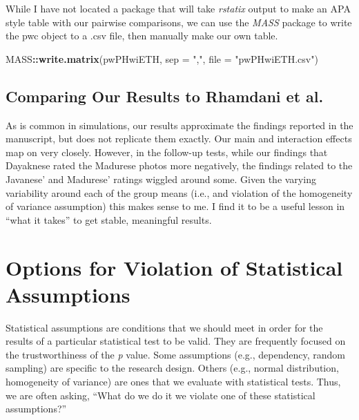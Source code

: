 \documentclass[
  11pt,
]{book}
\newenvironment{Shaded}{\begin{snugshade}}{\end{snugshade}}
\newcommand{\AttributeTok}[1]{\textcolor[rgb]{0.27,0.27,0.27}{#1}}
\newcommand{\FunctionTok}[1]{\textcolor[rgb]{0.27,0.27,0.27}{\textbf{#1}}}
\newcommand{\NormalTok}[1]{#1}
\newcommand{\SpecialCharTok}[1]{\textcolor[rgb]{0.43,0.43,0.43}{\textbf{#1}}}
\newcommand{\StringTok}[1]{\textcolor[rgb]{0.5,0.5,0.5}{#1}}
\begin{document}
While I have not located a package that will take \emph{rstatix} output to make an APA style table with our pairwise comparisons, we can use the \emph{MASS} package to write the pwc object to a .csv file, then manually make our own table.

\begin{Shaded}
\begin{Highlighting}[]
\NormalTok{MASS}\SpecialCharTok{::}\FunctionTok{write.matrix}\NormalTok{(pwPHwiETH, }\AttributeTok{sep =} \StringTok{","}\NormalTok{, }\AttributeTok{file =} \StringTok{"pwPHwiETH.csv"}\NormalTok{)}
\end{Highlighting}
\end{Shaded}

\hypertarget{comparing-our-results-to-rhamdani-et-al.--ramdhani_affective_2018}{%
\subsection{\texorpdfstring{Comparing Our Results to Rhamdani et al. \citeyearpar{ramdhani_affective_2018}}{Comparing Our Results to Rhamdani et al. {[}-@ramdhani\_affective\_2018{]}}}\label{comparing-our-results-to-rhamdani-et-al.--ramdhani_affective_2018}}

As is common in simulations, our results approximate the findings reported in the manuscript, but does not replicate them exactly. Our main and interaction effects map on very closely. However, in the follow-up tests, while our findings that Dayaknese rated the Madurese photos more negatively, the findings related to the Javanese' and Madurese' ratings wiggled around some. Given the varying variability around each of the group means (i.e., and violation of the homogeneity of variance assumption) this makes sense to me. I find it to be a useful lesson in ``what it takes'' to get stable, meaningful results.

\hypertarget{options-for-violation-of-statistical-assumptions}{%
\section{Options for Violation of Statistical Assumptions}\label{options-for-violation-of-statistical-assumptions}}

Statistical assumptions are conditions that we should meet in order for the results of a particular statistical test to be valid. They are frequently focused on the trustworthiness of the \emph{p} value. Some assumptions (e.g., dependency, random sampling) are specific to the research design. Others (e.g., normal distribution, homogeneity of variance) are ones that we evaluate with statistical tests. Thus, we are often asking, ``What do we do it we violate one of these statistical assumptions?''
\end{document}
